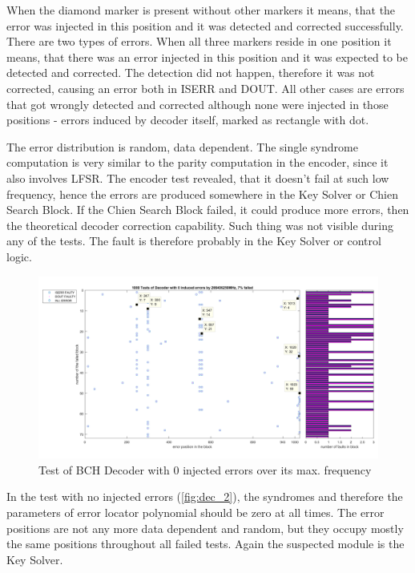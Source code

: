 When the diamond marker is present without other markers it means, that the error was injected in this position and it was detected and corrected successfully. There are two types of errors. When all three markers reside in one position it means, that there was an error injected in this position and it was expected to be detected and corrected. The detection did not happen, therefore it was not corrected, causing an error both in ISERR and DOUT. All other cases are errors that got wrongly detected and corrected although none were injected in those positions - errors induced by decoder itself, marked as rectangle with dot. 

The error distribution is random, data dependent. The single syndrome computation is very similar to the parity computation in the encoder, since it also involves LFSR. The encoder test revealed, that it doesn't fail at such low frequency, hence the errors are produced somewhere in the Key Solver or Chien Search Block. If the Chien Search Block failed, it could produce more errors, then the theoretical decoder correction capability. Such thing was not visible during any of the tests. The fault is therefore probably in the Key Solver or control logic.

\begin{figure}[h]
\centering
\includegraphics[width=\textwidth]{figures/1000_tests_0_faults_266_MHz_1.png}
\caption{Test of BCH Decoder with 0 injected errors over its max. frequency}
\label{fig:dec_2}
\end{figure}

In the test with no injected errors (\autoref{fig:dec_2}), the syndromes and therefore the parameters of error locator polynomial should be zero at all times. The error positions are not any more data dependent and random, but they occupy mostly the same positions throughout all failed tests. Again the suspected module is the Key Solver.

